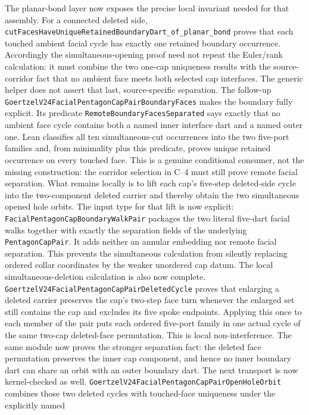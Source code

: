 \documentclass[11pt]{article}
\theoremstyle{definition}
\begin{document}
The planar-bond layer now exposes the precise local invariant needed for that
assembly.  For a connected deleted side,
\texttt{cutFacesHaveUniqueRetainedBoundaryDart\_of\_planar\_bond} proves that
each touched ambient facial cycle has exactly one retained boundary occurrence.
Accordingly the simultaneous-opening proof need not repeat the Euler/rank
calculation: it must combine the two one-cap uniqueness results with the
source-corridor fact that no ambient face meets both selected cap interfaces.
The generic helper does not assert that last, source-specific separation.
The follow-up
\texttt{GoertzelV24FacialPentagonCapPairBoundaryFaces} makes the boundary
fully explicit.  Its predicate \texttt{RemoteBoundaryFacesSeparated} says
exactly that no ambient face cycle contains both a named inner interface dart
and a named outer one.  Lean classifies all ten simultaneous-cut occurrences
into the two five-port families and, from minimality plus this predicate,
proves unique retained occurrence on every touched face.  This is a genuine
conditional consumer, not the missing construction: the corridor selection in
C--4 must still prove remote facial separation.  What remains locally is to
lift each cap's five-step deleted-side cycle into the two-component deleted
carrier and thereby obtain the two simultaneous opened hole orbits.
The input type for that lift is now explicit:
\texttt{FacialPentagonCapBoundaryWalkPair} packages the two literal five-dart
facial walks together with exactly the separation fields of the underlying
\texttt{PentagonCapPair}.  It adds neither an annular embedding nor remote
facial separation.  This prevents the simultaneous calculation from silently
replacing ordered collar coordinates by the weaker unordered cap datum.
The local simultaneous-deletion calculation is also now complete.
\texttt{GoertzelV24FacialPentagonCapPairDeletedCycle} proves that enlarging a
deleted carrier preserves the cap's two-step face turn whenever the enlarged
set still contains the cap and excludes its five spoke endpoints.  Applying
this once to each member of the pair puts each ordered five-port family in one
actual cycle of the same two-cap deleted-face permutation.  This is local
non-interference.  The same module now proves the stronger separation fact:
the deleted face permutation preserves the inner cap component, and hence no
inner boundary dart can share an orbit with an outer boundary dart.
The next transport is now kernel-checked as well.
\texttt{GoertzelV24FacialPentagonCapPairOpenHoleOrbit} combines those two
deleted cycles with touched-face uniqueness under the explicitly named
\end{document}
